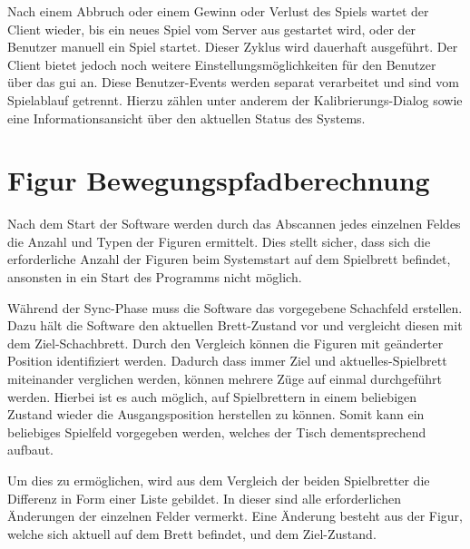 Nach einem Abbruch oder einem Gewinn oder Verlust des Spiels wartet der
Client wieder, bis ein neues Spiel vom Server aus gestartet wird, oder
der Benutzer manuell ein Spiel startet. Dieser Zyklus wird dauerhaft
ausgeführt. Der Client bietet jedoch noch weitere
Einstellungsmöglichkeiten für den Benutzer über das \gls{gui} an. Diese
Benutzer-Events werden separat verarbeitet und sind vom Spielablauf
getrennt. Hierzu zählen unter anderem der Kalibrierungs-Dialog sowie
eine Informationsansicht über den aktuellen Status des Systems.

\hypertarget{figur-bewegungspfadberechnung}{%
\section{Figur
Bewegungspfadberechnung}\label{figur-bewegungspfadberechnung}}

Nach dem Start der Software werden durch das Abscannen jedes einzelnen
Feldes die Anzahl und Typen der Figuren ermittelt. Dies stellt sicher,
dass sich die erforderliche Anzahl der Figuren beim Systemstart auf dem
Spielbrett befindet, ansonsten in ein Start des Programms nicht möglich.

Während der Sync-Phase muss die Software das vorgegebene Schachfeld
erstellen. Dazu hält die Software den aktuellen Brett-Zustand vor und
vergleicht diesen mit dem Ziel-Schachbrett. Durch den Vergleich können
die Figuren mit geänderter Position identifiziert werden. Dadurch dass
immer Ziel und aktuelles-Spielbrett miteinander verglichen werden,
können mehrere Züge auf einmal durchgeführt werden. Hierbei ist es auch
möglich, auf Spielbrettern in einem beliebigen Zustand wieder die
Ausgangsposition herstellen zu können. Somit kann ein beliebiges
Spielfeld vorgegeben werden, welches der Tisch dementsprechend aufbaut.

Um dies zu ermöglichen, wird aus dem Vergleich der beiden Spielbretter
die Differenz in Form einer Liste gebildet. In dieser sind alle
erforderlichen Änderungen der einzelnen Felder vermerkt. Eine Änderung
besteht aus der Figur, welche sich aktuell auf dem Brett befindet, und
dem Ziel-Zustand.

